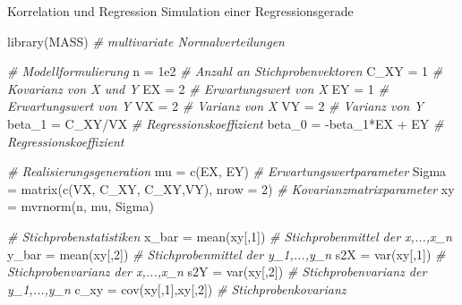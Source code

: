 \documentclass[
  8pt,
  ignorenonframetext,
]{beamer}
\newenvironment{Shaded}{\begin{snugshade}}{\end{snugshade}}
\newcommand{\AttributeTok}[1]{\textcolor[rgb]{0.77,0.63,0.00}{#1}}
\newcommand{\CommentTok}[1]{\textcolor[rgb]{0.56,0.35,0.01}{\textit{#1}}}
\newcommand{\DecValTok}[1]{\textcolor[rgb]{0.00,0.00,0.81}{#1}}
\newcommand{\FloatTok}[1]{\textcolor[rgb]{0.00,0.00,0.81}{#1}}
\newcommand{\FunctionTok}[1]{\textcolor[rgb]{0.00,0.00,0.00}{#1}}
\newcommand{\NormalTok}[1]{#1}
\newcommand{\OtherTok}[1]{\textcolor[rgb]{0.56,0.35,0.01}{#1}}
\newcommand{\SpecialCharTok}[1]{\textcolor[rgb]{0.00,0.00,0.00}{#1}}
\begin{document}
\begin{frame}[fragile]{Korrelation und Regression}
\protect\hypertarget{korrelation-und-regression-7}{}
Simulation einer Regressionsgerade

\tiny
{}

\begin{Shaded}
\begin{Highlighting}[]
\FunctionTok{library}\NormalTok{(MASS)                                   }\CommentTok{\# multivariate Normalverteilungen}

\CommentTok{\# Modellformulierung}
\NormalTok{n      }\OtherTok{=} \FloatTok{1e2}                                     \CommentTok{\# Anzahl an Stichprobenvektoren}
\NormalTok{C\_XY   }\OtherTok{=} \DecValTok{1}                                      \CommentTok{\# Kovarianz von X und Y}
\NormalTok{EX     }\OtherTok{=} \DecValTok{2}                                      \CommentTok{\# Erwartungswert von X}
\NormalTok{EY     }\OtherTok{=} \DecValTok{1}                                      \CommentTok{\# Erwartungswert von Y}
\NormalTok{VX     }\OtherTok{=} \DecValTok{2}                                      \CommentTok{\# Varianz von X}
\NormalTok{VY     }\OtherTok{=} \DecValTok{2}                                      \CommentTok{\# Varianz von Y}
\NormalTok{beta\_1 }\OtherTok{=}\NormalTok{ C\_XY}\SpecialCharTok{/}\NormalTok{VX                                }\CommentTok{\# Regressionskoeffizient}
\NormalTok{beta\_0 }\OtherTok{=} \SpecialCharTok{{-}}\NormalTok{beta\_1}\SpecialCharTok{*}\NormalTok{EX }\SpecialCharTok{+}\NormalTok{ EY                        }\CommentTok{\# Regressionskoeffizient}

\CommentTok{\# Realisierungsgeneration}
\NormalTok{mu     }\OtherTok{=} \FunctionTok{c}\NormalTok{(EX, EY)                              }\CommentTok{\# Erwartungswertparameter}
\NormalTok{Sigma  }\OtherTok{=} \FunctionTok{matrix}\NormalTok{(}\FunctionTok{c}\NormalTok{(VX, C\_XY, C\_XY,VY), }\AttributeTok{nrow =} \DecValTok{2}\NormalTok{) }\CommentTok{\# Kovarianzmatrixparameter}
\NormalTok{xy     }\OtherTok{=} \FunctionTok{mvrnorm}\NormalTok{(n, mu, Sigma)}

\CommentTok{\# Stichprobenstatistiken}
\NormalTok{x\_bar  }\OtherTok{=} \FunctionTok{mean}\NormalTok{(xy[,}\DecValTok{1}\NormalTok{])                           }\CommentTok{\# Stichprobenmittel  der x,...,x\_n}
\NormalTok{y\_bar  }\OtherTok{=} \FunctionTok{mean}\NormalTok{(xy[,}\DecValTok{2}\NormalTok{])                           }\CommentTok{\# Stichprobenmittel  der y\_1,...,y\_n}
\NormalTok{s2X    }\OtherTok{=} \FunctionTok{var}\NormalTok{(xy[,}\DecValTok{1}\NormalTok{])                            }\CommentTok{\# Stichprobenvarianz der x,...,x\_n}
\NormalTok{s2Y    }\OtherTok{=} \FunctionTok{var}\NormalTok{(xy[,}\DecValTok{2}\NormalTok{])                            }\CommentTok{\# Stichprobenvarianz der y\_1,...,y\_n}
\NormalTok{c\_xy   }\OtherTok{=} \FunctionTok{cov}\NormalTok{(xy[,}\DecValTok{1}\NormalTok{],xy[,}\DecValTok{2}\NormalTok{])                     }\CommentTok{\# Stichprobenkovarianz}


\end{Highlighting}
\end{Shaded}
\end{frame}
\end{document}
